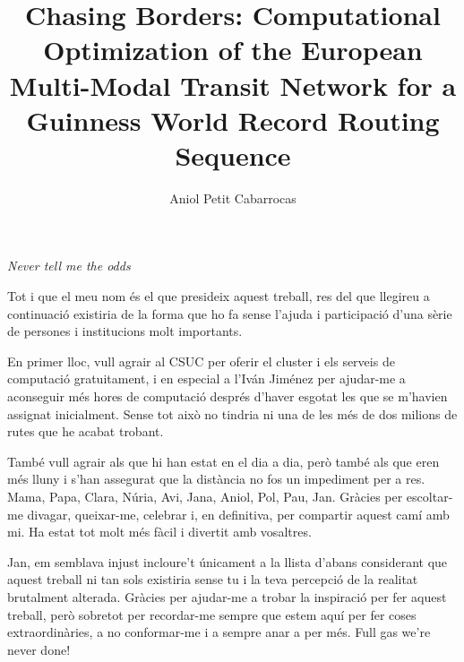 \documentclass[11pt, a4paper,twoside,openany]{tfg_dtic_upf}
\title{Chasing Borders: Computational Optimization of the European Multi-Modal Transit Network for a Guinness World Record Routing Sequence}
\author{Aniol Petit Cabarrocas}
\let\cleardoublepage\clearpage
\numberwithin{equation}{section}
\begin{document}
\frontmatter



\maketitle

\cleardoublepage


%
\noindent \textit{Never tell me the odds} 

\cleardoublepage



 \newline
\noindent Tot i que el meu nom és el que presideix aquest treball, res del que llegireu a continuació existiria de la forma que ho fa sense l'ajuda i participació d'una sèrie de persones i institucions molt importants.

\medskip

En primer lloc, vull agrair al CSUC per oferir el cluster i els serveis de computació gratuitament, i en especial a l'Iván Jiménez per ajudar-me a aconseguir més hores de computació després d'haver esgotat les que se m'havien assignat inicialment. Sense tot això no tindria ni una de les més de dos milions de rutes que he acabat trobant.

\medskip

També vull agrair als que hi han estat en el dia a dia, però també als que eren més lluny i s'han assegurat que la distància no fos un impediment per a res. Mama, Papa, Clara, Núria, Avi, Jana, Aniol, Pol, Pau, Jan. Gràcies per escoltar-me divagar, queixar-me, celebrar i, en definitiva, per compartir aquest camí amb mi. Ha estat tot molt més fàcil i divertit amb vosaltres.

\medskip

Jan, em semblava injust incloure't únicament a la llista d'abans considerant que aquest treball ni tan sols existiria sense tu i la teva percepció de la realitat brutalment alterada. Gràcies per ajudar-me a trobar la inspiració per fer aquest treball, però sobretot per recordar-me sempre que estem aquí per fer coses extraordinàries, a no conformar-me i a sempre anar a per més. Full gas we're never done!
\end{document}
